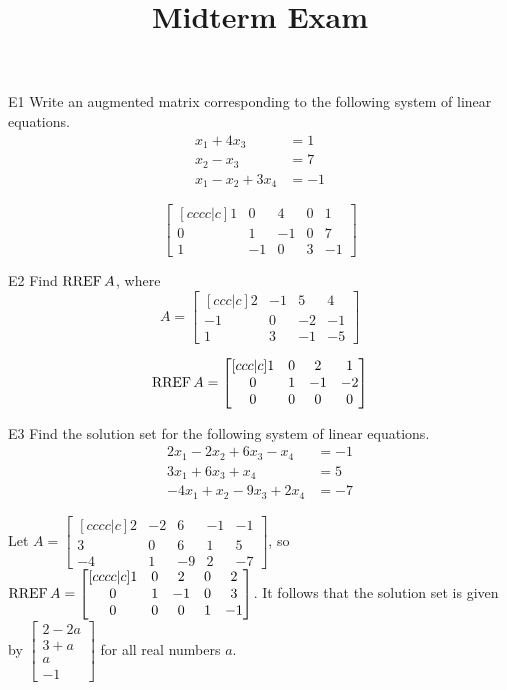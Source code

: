 \documentclass{sbgLAexam}
\title{Midterm Exam}
\begin{document}
\begin{problem}{E1}
Write an augmented matrix corresponding to the following system of linear equations.
\begin{align*}
x_1+4x_3 &= 1 \\
x_2-x_3 &= 7 \\
x_1-x_2+3x_4 &= -1
\end{align*}
\end{problem}
\begin{solution}
\[
\begin{bmatrix}[cccc|c]
1 & 0 & 4 & 0 & 1 \\
0 & 1 & -1 & 0 & 7 \\
1 & -1 & 0 & 3 & -1
\end{bmatrix}
\]
\end{solution}

\begin{problem}{E2}
Find \(\operatorname{RREF} A\), where
\[
  A =
  \begin{bmatrix}[ccc|c]
    2 & -1 & 5 & 4 \\
    -1 & 0 & -2 & -1 \\
    1 & 3 & -1 & -5
  \end{bmatrix}
\]
\end{problem}
\begin{solution}
\[
  \operatorname{RREF} A =
  \begin{bmatrix}[ccc|c]
    1 & 0 & 2 & 1 \\
    0 & 1 & -1 & -2 \\
    0 & 0 & 0 & 0
  \end{bmatrix}
\]
\end{solution}

\begin{extract}\newpage\end{extract}
\begin{problem}{E3}
Find the solution set for the following system of linear equations.
\begin{align*}
2x_1-2x_2+6x_3-x_4 &=-1 \\
3x_1+6x_3+x_4 &= 5 \\
-4x_1+x_2-9x_3+2x_4&=-7
\end{align*}
\end{problem}
\begin{solution}
Let \(A =
  \begin{bmatrix}[cccc|c]
    2 & -2 & 6 & -1 & -1 \\
    3 & 0 & 6 & 1 & 5 \\
    -4 & 1 & -9 & 2 & -7
  \end{bmatrix}
\), so \(\operatorname{RREF} A =
  \begin{bmatrix}[cccc|c]
    1 & 0 & 2 & 0 & 2 \\
    0 & 1 & -1 & 0 & 3 \\
    0 & 0 & 0 & 1 & -1
  \end{bmatrix}
\). It follows that the solution set is given by \(
  \begin{bmatrix}
    2 - 2a \\
    3 + a \\
    a \\
    -1
  \end{bmatrix}
\) for all real numbers \(a\).
\end{solution}
\end{document}
